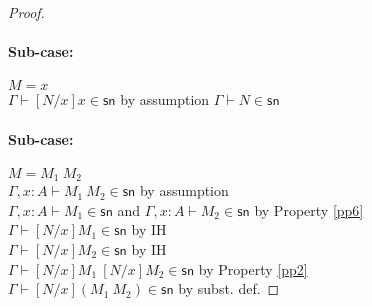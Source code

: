 \documentclass{article}
\newcommand{\csn}{\mathsf{sn}}
\begin{document}
\begin{proof}
\paragraph{Sub-case:} $M = x$
\\
$\Gamma \vdash [N/x]x \in \csn$ \hfill by assumption $\Gamma \vdash N \in \csn$
%
\paragraph{Sub-case:} $M = M_1~M_2$
\\
$\Gamma,x{:}A \vdash M_1~M_2 \in \csn$ \hfill by assumption \\
$\Gamma, x{:}A \vdash M_1 \in \csn$ and $\Gamma, x{:}A \vdash M_2 \in \csn$ \hfill by Property \ref{pp6} \\
$\Gamma \vdash [N/x]M_1 \in \csn$ \hfill by IH \\
$\Gamma \vdash [N/x]M_2 \in \csn$ \hfill by IH \\
$\Gamma \vdash [N/x]M_1~[N/x]M_2 \in \csn$ \hfill by Property \ref{pp2}\\
$\Gamma \vdash [N/x](M_1~M_2) \in \csn$ \hfill by subst. def.
%

\end{proof}
\end{document}
